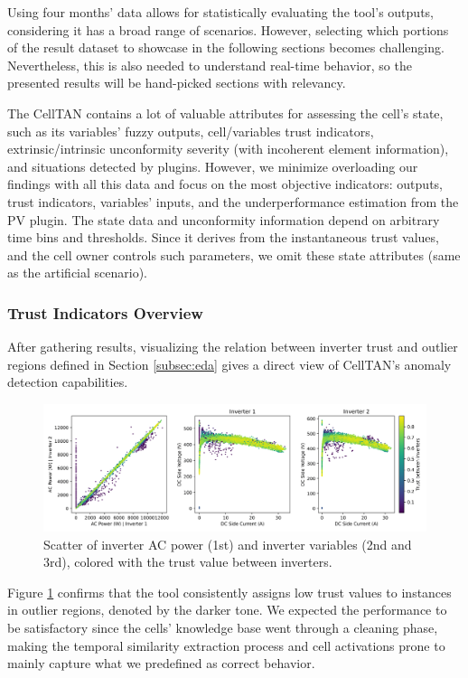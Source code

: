 Using four months' data allows for statistically evaluating the tool's outputs, considering it has a broad range of scenarios. However, selecting which portions of the result dataset to showcase in the following sections becomes challenging. Nevertheless, this is also needed to understand real-time behavior, so the presented results will be hand-picked sections with relevancy.

The CellTAN contains a lot of valuable attributes for assessing the cell's state, such as its variables' fuzzy outputs, cell/variables trust indicators, extrinsic/intrinsic unconformity severity (with incoherent element information), and situations detected by plugins. However, we minimize overloading our findings with all this data and focus on the most objective indicators: outputs, trust indicators, variables' inputs, and the underperformance estimation from the PV plugin. The state data and unconformity information depend on arbitrary time bins and thresholds. Since it derives from the instantaneous trust values, and the cell owner controls such parameters, we omit these state attributes (same as the artificial scenario).

\subsubsection{Trust Indicators Overview}

After gathering results, visualizing the relation between inverter trust and outlier regions defined in Section \ref{subsec:eda} gives a direct view of CellTAN's anomaly detection capabilities.

\begin{figure}[h!]
    \centering
    \includegraphics[width=\textwidth]{figures/chapter5/results/real/52_scatter_with_trust-1.png}
    \caption{Scatter of inverter AC power (1st) and inverter variables (2nd and 3rd), colored with the trust value between inverters.}
    \label{fig:real_sim_trust_scatter}
\end{figure}

Figure \ref{fig:real_sim_trust_scatter} confirms that the tool consistently assigns low trust values to instances in outlier regions, denoted by the darker tone. We expected the performance to be satisfactory since the cells' knowledge base went through a cleaning phase, making the temporal similarity extraction process and cell activations prone to mainly capture what we predefined as correct behavior.

